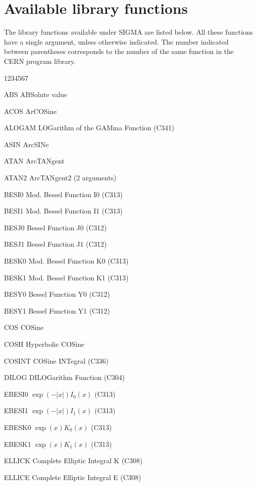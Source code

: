 \section{Available library functions}
 
The library functions available under SIGMA are
listed below. All these functions have a single
argument, unless otherwise indicated.
The number indicated between parentheses corresponds to the
number of the same function in the CERN program library.

{\small
\begin{DLttc}{1234567}
\item[ABS]     ABSolute value
\item[ACOS]    ArCOSine
\item[ALOGAM]  LOGarithm of the GAMma Function (C341)
\item[ASIN]    ArcSINe
\item[ATAN]    ArcTANgent
\item[ATAN2]   ArcTANgent2 (2 arguments)
\item[BESI0]   Mod. Bessel Function I0 (C313)
\item[BESI1]   Mod. Bessel Function I1 (C313)
\item[BESJ0]   Bessel Function J0 (C312)
\item[BESJ1]   Bessel Function J1 (C312)
\item[BESK0]   Mod. Bessel Function K0 (C313)
\item[BESK1]   Mod. Bessel Function K1 (C313)
\item[BESY0]   Bessel Function Y0 (C312)
\item[BESY1]   Bessel Function Y1 (C312)
\item[COS]     COSine
\item[COSH]    Hyperbolic COSine
\item[COSINT]  COSine INTegral (C336)
\item[DILOG]   DILOGarithm Function (C304)
\item[EBESI0]  \(\exp(-\left|x\right|)I_0(x)\) (C313)
\item[EBESI1]  \(\exp(-\left|x\right|)I_1(x)\) (C313)
\item[EBESK0]  \(\exp(x)K_0(x)\) (C313)
\item[EBESK1]  \(\exp(x)K_1(x)\) (C313)
\item[ELLICK]  Complete Elliptic Integral K (C308)
\item[ELLICE]  Complete Elliptic Integral E (C308)

\end{DLttc}}
